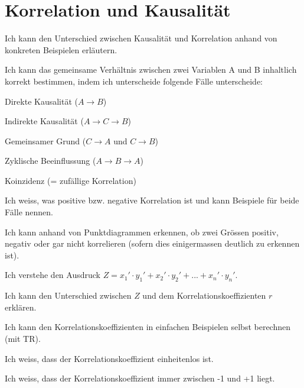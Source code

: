 \section{Korrelation und Kausalität}
\begin{todolist}
    \item Ich kann den Unterschied zwischen Kausalität und Korrelation anhand von konkreten Beispielen erläutern.
    \item Ich kann das gemeinsame Verhältnis zwischen zwei Variablen A und B inhaltlich korrekt bestimmen, indem ich unterscheide folgende Fälle unterscheide:
    \begin{todolist}
        \item Direkte Kausalität ($A\rightarrow B$)
        \item Indirekte Kausalität ($A\rightarrow C\rightarrow B$)
        \item Gemeinsamer Grund ($C\rightarrow A$ und $C\rightarrow B$)
        \item Zyklische Beeinflussung ($A\rightarrow B \rightarrow A$)
        \item Koinzidenz (= zufällige Korrelation)
    \end{todolist}
    \item Ich weiss, was positive bzw. negative Korrelation ist und kann Beispiele für beide Fälle nennen.
    \item Ich kann anhand von Punktdiagrammen erkennen, ob zwei Grössen positiv,
    negativ oder gar nicht korrelieren (sofern dies einigermassen deutlich zu
    erkennen ist).
    \item Ich verstehe den Ausdruck $Z=x_1'\cdot y_1'+x_2'\cdot y_2'+...+x_n'\cdot y_n'$.
    \item Ich kann den Unterschied zwischen $Z$ und dem Korrelationskoeffizienten $r$ erklären.
    \item Ich kann den Korrelationskoeffizienten in einfachen Beispielen selbst berechnen
    (mit TR).
    \item Ich weiss, dass der Korrelationskoeffizient einheitenlos ist.
    \item Ich weiss, dass der Korrelationskoeffizient immer zwischen -1 und +1 liegt.
\end{todolist}


